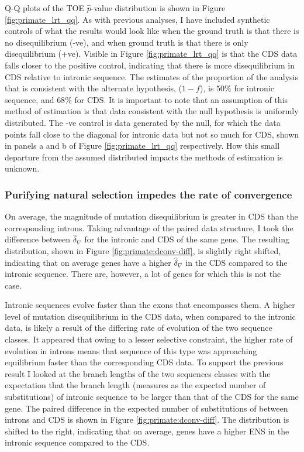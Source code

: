 Q-Q plots of the TOE $\hat p$-value distribution is shown in Figure \ref{fig:primate_lrt_qq}. As with previous analyses, I have included synthetic controls of what the results would look like when the ground truth is that there is no disequilibrium (-ve), and when ground truth is that there is only disequilibrium (+ve). Visible in Figure \ref{fig:primate_lrt_qq} is that the CDS data falls closer to the positive control, indicating that there is more disequilibrium in CDS relative to intronic sequence. The estimates of the proportion of the analysis that is consistent with the alternate hypothesis, ($1-f$), is $50\%$ for intronic sequence, and $68\%$ for CDS. It is important to note that an assumption of this method of estimation is that data consistent with the null hypothesis is uniformly distributed. 
The -ve control is data generated by the null, for which the data points fall close to the diagonal for intronic data but not so much for CDS, shown in panels a and b of Figure \ref{fig:primate_lrt_qq} respectively. How this small departure from the assumed distributed impacts the methods of estimation is unknown. 



\subsubsection{Purifying natural selection impedes the rate of convergence}

On average, the magnitude of mutation disequilibrium is greater in CDS than the corresponding introns. Taking advantage of the paired data structure, I took the difference between $\hat \delta_\nabla$ for the intronic and CDS of the same gene. The resulting distribution, shown in Figure \ref{fig:primate:dconv-diff}, is slightly right shifted, indicating that on average genes have a higher $\hat \delta_\nabla$ in the CDS compared to the intronic sequence. There are, however, a lot of genes for which this is not the case. 

Intronic sequences evolve faster than the exons that encompasses them. A higher level of mutation disequilibrium in the CDS data, when compared to the intronic data, is likely a result of the differing rate of evolution of the two sequence classes. It appeared that owing to a lesser selective constraint, the higher rate of evolution in introns means that sequence of this type was approaching equilibrium faster than the corresponding CDS data. To support the previous result I looked at the branch lengths of the two sequences classes with the expectation that the branch length (measures as the expected number of substitutions) of intronic sequence to be larger than that of the CDS for the same gene. The paired difference in the expected number of substitutions of between introns and CDS is shown in Figure \ref{fig:primate:dconv-diff}. The distribution is shifted to the right, indicating that on average, genes have a higher ENS in the intronic sequence compared to the CDS. 

